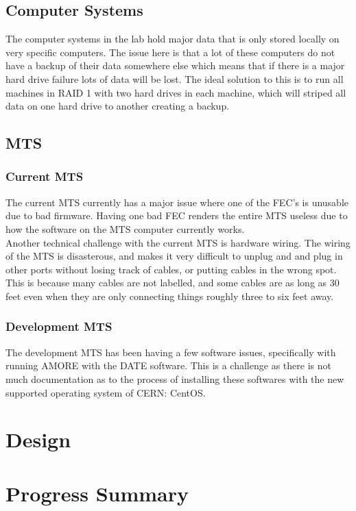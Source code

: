 \documentclass[12pt]{article}
\newcommand\tab[1][1cm]{\hspace*{#1}}
\begin{document}
\subsection{Computer Systems}
\tab The computer systems in the lab hold major data that is only stored locally on very specific computers. The issue here is that a lot of these computers do not have a backup of their data somewhere else which means that if there is a major hard drive failure lots of data will be lost. The ideal solution to this is to run all machines in RAID 1 with two hard drives in each machine, which will striped all data on one hard drive to another creating a backup. 
\subsection{MTS}
\subsubsection{Current MTS}
\tab The current MTS currently has a major issue where one of the FEC's is unusable due to bad firmware. Having one bad FEC renders the entire MTS useless due to how the software on the MTS computer currently works. \\
\tab Another technical challenge with the current MTS is hardware wiring. The wiring of the MTS is disasterous, and makes it very difficult to unplug and and plug in other ports without losing track of cables, or putting cables in the wrong spot. This is because many cables are not labelled, and some cables are as long as 30 feet even when they are only connecting things roughly three to six feet away.
\subsubsection{Development MTS}
\tab The development MTS has been having a few software issues, specifically with running AMORE with the DATE software. This is a challenge as there is not much documentation as to the process of installing these softwares with the new supported operating system of CERN: CentOS.
 
\section{Design}

\section{Progress Summary}
\end{document}
